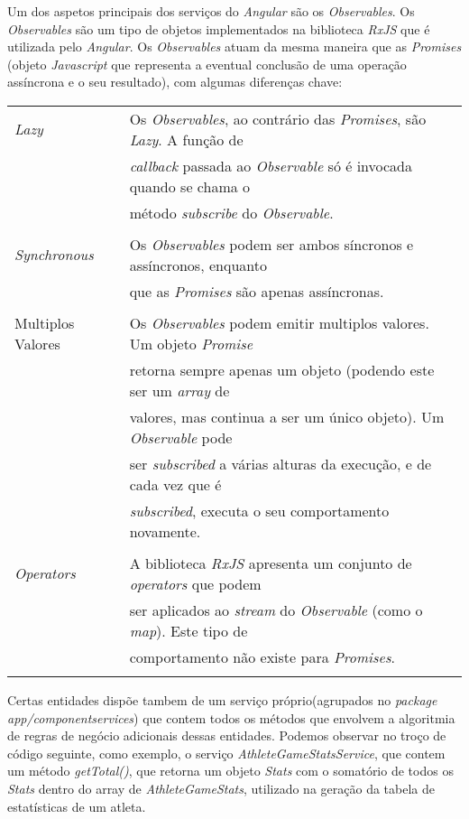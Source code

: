 Um dos aspetos principais dos serviços do \textit{Angular} são os \textit{Observables}. Os \textit{Observables} são um tipo de objetos implementados na biblioteca \textit{RxJS} que é utilizada pelo \textit{Angular}. Os \textit{Observables} atuam da mesma maneira que as \textit{Promises} (objeto \textit{Javascript} que representa a eventual conclusão de uma operação assíncrona e o seu resultado), com algumas diferenças chave: \\

\begin{tabular}{ll}
	\textit{Lazy} & Os \textit{Observables}, ao contrário das \textit{Promises}, são \textit{Lazy}. A função de\\
	& \textit{callback} passada ao \textit{Observable} só é invocada quando se chama o \\
	&método \textit{subscribe} do \textit{Observable}. \\
	\\
	\textit{Synchronous} & Os \textit{Observables} podem ser ambos síncronos e assíncronos, enquanto\\
	& que as \textit{Promises} são apenas assíncronas. \\
	\\
	Multiplos Valores & Os \textit{Observables} podem emitir multiplos valores. Um objeto \textit{Promise}\\
	& retorna sempre apenas um objeto (podendo este ser um \textit{array} de \\
	&valores, mas continua a ser um único objeto). Um \textit{Observable} pode \\
	&ser \textit{subscribed} a várias alturas da execução, e de cada vez que é \\
	&\textit{subscribed}, executa o seu comportamento novamente.\\
	\\
	\textit{Operators} & A biblioteca \textit{RxJS} apresenta um conjunto de \textit{operators} que podem \\
	&ser aplicados ao \textit{stream} do \textit{Observable} (como o \textit{map}). Este tipo de\\
	&comportamento não existe para \textit{Promises}.\\
	
	\\
\end{tabular}


Certas entidades dispõe tambem de um serviço próprio(agrupados no \textit{package} \textit{app/componentservices}) que contem todos os métodos que envolvem a algoritmia de regras de negócio adicionais dessas entidades. 
Podemos observar no troço de código seguinte, como exemplo, o serviço \textit{AthleteGameStatsService}, que contem um método \textit{getTotal()}, que retorna um objeto \textit{Stats} com o somatório de todos os \textit{Stats} dentro do array de \textit{AthleteGameStats}, utilizado na geração da tabela de estatísticas de um atleta. 


